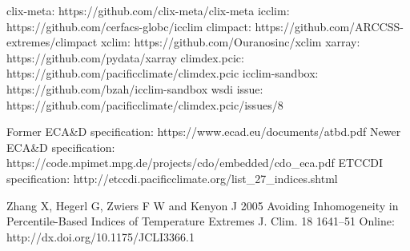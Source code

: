 \documentclass[a4paper,11pt]{article}
\begin{document}
\begin{thebibliography}{10}
        clix-meta: https://github.com/clix-meta/clix-meta
        icclim: https://github.com/cerfacs-globc/icclim
        climpact: https://github.com/ARCCSS-extremes/climpact
        xclim: https://github.com/Ouranosinc/xclim
        xarray: https://github.com/pydata/xarray
        climdex.pcic: https://github.com/pacificclimate/climdex.pcic    
        icclim-sandbox: https://github.com/bzah/icclim-sandbox
        wsdi issue: https://github.com/pacificclimate/climdex.pcic/issues/8
        
        Former ECA\&D specification: https://www.ecad.eu/documents/atbd.pdf
        Newer ECA\&D specification: https://code.mpimet.mpg.de/projects/cdo/embedded/cdo\_eca.pdf
        ETCCDI specification: http://etccdi.pacificclimate.org/list\_27\_indices.shtml

        Zhang X, Hegerl G, Zwiers F W and Kenyon J 2005 Avoiding Inhomogeneity in Percentile-Based Indices of Temperature Extremes J. Clim. 18 1641–51 Online: http://dx.doi.org/10.1175/JCLI3366.1
\end{thebibliography}
\end{document}
